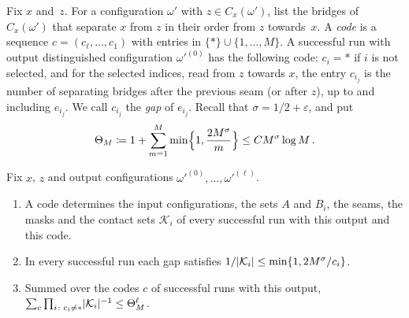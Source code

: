 Fix $x$ and~$z$. For a configuration $\omega'$ with $z\in C_x(\omega')$, list the bridges of
$C_x(\omega')$ that separate $x$ from $z$ in their order from $z$ towards~$x$. A \emph{code} is a
sequence $c=(c_\ell,\dots,c_1)$ with entries in $\{\ast\}\cup\{1,\dots,M\}$. A successful run with output
distinguished configuration $\omega'^{(0)}$ has the following code: $c_i=\ast$ if $i$ is not selected,
and for the selected indices, read from $z$ towards $x$, the entry $c_{i_j}$ is the number of
separating bridges after the previous seam (or after $z$), up to and including $e_{i_j}$. We call
$c_{i_j}$ the \emph{gap} of $e_{i_j}$. Recall that $\sigma=1/2+\varepsilon$, and put
\begin{equation*}
  \Theta_M\coloneqq1+\sum_{m=1}^M\min\Bigl\{1,\frac{2M^\sigma}{m}\Bigr\}\le CM^\sigma\log M\,.
\end{equation*}

\begin{lemma}\label{lem:codes}
Fix $x$, $z$ and output configurations $\omega'^{(0)},\dots,\omega'^{(\ell)}$.
\begin{enumerate}[label=\textup{(\alph*)}]
  \item\label{it:codes-inverse} A code determines the input configurations, the sets $A$ and $B_i$, the
  seams, the masks and the contact sets $\mathcal K_i$ of every successful run with this output and
  this code.
  \item\label{it:codes-gaps} In every successful run each gap satisfies
  $1/\lvert\mathcal K_{i}\rvert\le\min\{1,2M^\sigma/c_{i}\}$.
  \item\label{it:codes-sum} Summed over the codes $c$ of successful runs with this output,
  $\sum_c\prod_{i\colon c_i\neq\ast}\lvert\mathcal K_i\rvert^{-1}\le\Theta_M^\ell$.
\end{enumerate}
\end{lemma}

